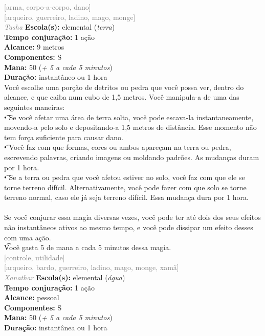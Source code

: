 \documentclass{RPG_Adventure}[2021/10/20]
\begin{document}
{\scriptsize \textcolor{gray}{[arma, corpo-a-corpo, dano]\\}}
{\scriptsize \textcolor{gray}{[arqueiro, guerreiro, ladino, mago, monge]\\}}
{\tiny \textcolor{gray}{\textit{Tasha}}}\jump{}
{\small \t \textbf{Escola(s):} elemental (\textit{terra})\\\t \textbf{Tempo conjuração:} 1 ação\\\t \textbf{Alcance:} 9 metros\\\t \textbf{Componentes:} S\\\t \textbf{Mana:} 50 (\textit{+ 5 a cada 5 minutos})\\\t \textbf{Duração:} instantâneo ou 1 hora\\}
{\normalsize Você escolhe uma porção de detritos ou pedra que você possa ver, dentro do alcance, e que caiba num cubo de 1,5 metros. Você manipula-a de uma das seguintes maneiras: \\\t • Se você afetar uma área de terra solta, você pode escava-la instantaneamente, movendo-a pelo solo e depositando-a 1,5 metros de distância. Esse momento não tem força suficiente para causar dano.\\\t • Você faz com que formas, cores ou ambos apareçam na terra ou pedra, escrevendo palavras, criando imagens ou moldando padrões. As mudanças duram por 1 hora.\\\t • Se a terra ou pedra que você afetou estiver no solo, você faz com que ele se torne terreno difícil. Alternativamente, você pode fazer com que solo se torne terreno normal, caso ele já seja terreno difícil. Essa mudança dura por 1 hora.\\\\Se você conjurar essa magia diversas vezes, você pode ter até dois dos seus efeitos não instantâneos ativos ao mesmo tempo, e você pode dissipar um efeito desses com uma ação.\\\t Você gasta 5 de mana a cada 5 minutos dessa magia.\\}
{\scriptsize \textcolor{gray}{[controle, utilidade]\\}}
{\scriptsize \textcolor{gray}{[arqueiro, bardo, guerreiro, ladino, mago, monge, xamã]\\}}
{\tiny \textcolor{gray}{\textit{Xanathar}}}\jump{}
{\small \t \textbf{Escola(s):} elemental (\textit{água})\\\t \textbf{Tempo conjuração:} 1 ação\\\t \textbf{Alcance:} pessoal\\\t \textbf{Componentes:} S\\\t \textbf{Mana:} 50 (\textit{+ 5 a cada 5 minutos})\\\t \textbf{Duração:} instantânea ou 1 hora\\}
\end{document}
